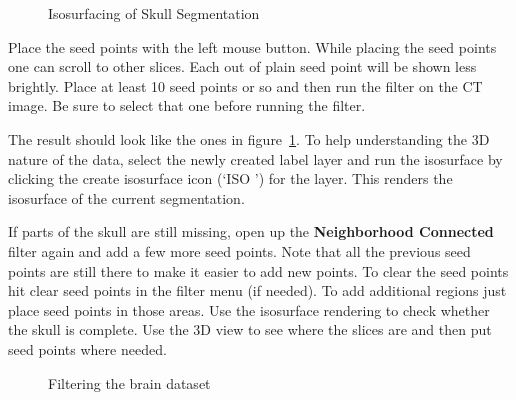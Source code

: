 \documentclass[fleqn,11pt,openany]{book}
\begin{document}
\begin{figure}
\caption{Isosurfacing of Skull Segmentation}\label{fig:SkullSegmentation}
\end{figure}

Place the seed points with the left mouse button. While placing the seed points one can scroll to other slices. Each out of plain seed point will be shown less brightly. Place at least 10 seed points or so and then run the filter on the CT image. Be sure to select that one before running the filter.

The result should look like the ones in figure~\ref{fig:SkullSegmentation}. To help understanding the 3D nature of the data, select the newly created label layer and run the isosurface by clicking the create isosurface icon 
(`ISO \Forward') for the layer.  This renders the isosurface of the current segmentation.

If parts of the skull are still missing, open up the {\bf Neighborhood Connected} filter again and add a few more seed points. Note that all the previous seed points are still there to make it easier to add new points. To clear the seed points hit clear seed points in the filter menu (if needed). To add additional regions just place seed points in those areas. Use the isosurface rendering to check whether the skull is complete. Use the 3D view to see where the slices are and then put seed points where needed.


\begin{figure}
\caption{Filtering the brain dataset}\label{fig:Median-ImageCorrected}
\end{figure}
\end{document}

